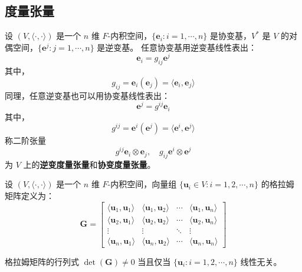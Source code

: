 \vspace{1em}
\subsection{度量张量}

\begin{definition}
    设 $(V,\langle \cdot,\cdot\rangle)$ 是一个 $n$ 维 $F$-内积空间，$\{\mathbf{e}_i:i=1,\cdots,n\}$ 是协变基，$V^*$ 是 $V$ 的对偶空间，$\{\mathbf{e}^j:j=1,\cdots,n\}$ 是逆变基。
    任意协变基用逆变基线性表出：
    \[
        \mathbf{e}_i = g_{ij}\mathbf{e}^j
    \]
    其中，
    \[
        g_{ij} = \mathbf{e}_i(\mathbf{e}_j) = \langle \mathbf{e}_i,\mathbf{e}_j \rangle
    \]
    同理，任意逆变基也可以用协变基线性表出：
    \[
        \mathbf{e}^j = g^{ij}\mathbf{e}_i
    \]
    其中，
    \[
        g^{ij} = \mathbf{e}^i(\mathbf{e}^j) = \langle \mathbf{e}^i,\mathbf{e}^j \rangle
    \]
    称二阶张量
    \[
        g^{ij} \mathbf{e}_i\otimes \mathbf{e}_j,\quad g_{ij} \mathbf{e}^i\otimes \mathbf{e}^j
    \]
    为 $V$ 上的\textbf{逆变度量张量}和\textbf{协变度量张量}。
    \label{def:metric_tensor}
\end{definition}

\begin{definition}
    设 $(V,\langle \cdot,\cdot\rangle)$ 是一个 $n$ 维 $F$-内积空间，向量组 $\{\mathbf{u}_i\in V:i=1,2,\cdots,n\}$ 的格拉姆矩阵定义为：
    \[
        \mathbf{G} = \begin{bmatrix}
            \langle \mathbf{u}_1,\mathbf{u}_1 \rangle & \langle \mathbf{u}_1,\mathbf{u}_2 \rangle & \cdots & \langle \mathbf{u}_1,\mathbf{u}_n \rangle \\
            \langle \mathbf{u}_2,\mathbf{u}_1 \rangle & \langle \mathbf{u}_2,\mathbf{u}_2 \rangle & \cdots & \langle \mathbf{u}_2,\mathbf{u}_n \rangle \\
            \vdots & \vdots & \ddots & \vdots \\
            \langle \mathbf{u}_n,\mathbf{u}_1 \rangle & \langle \mathbf{u}_n,\mathbf{u}_2 \rangle & \cdots & \langle \mathbf{u}_n,\mathbf{u}_n \rangle
        \end{bmatrix}
    \]
    \label{def:gram_matrix}
\end{definition}

\begin{proposition}
    格拉姆矩阵的行列式 $\det(\mathbf{G}) \neq 0$ 当且仅当 $\{\mathbf{u}_i:i=1,2,\cdots,n\}$ 线性无关。
\end{proposition}


